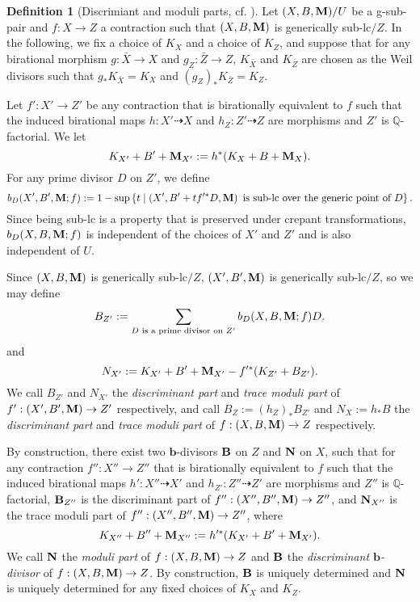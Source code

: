 \documentclass[11pt]{amsart}
\numberwithin{equation}{section}
\newcommand{\bb}{\bm{b}}
\newcommand{\Mm}{{\bf{M}}}
\newcommand{\Nn}{{\bf{N}}}
\newcommand{\Qq}{\mathbb{Q}}
\newcommand{\Bb}{{\bf{B}}}
\theoremstyle{definition}
\newtheorem{defn}[thm]{Definition}
\theoremstyle{definition}
\theoremstyle{definition}
\begin{document}
\begin{defn}[Discrimiant and moduli parts, cf. {\cite[Definition 2.3]{ACSS21}}]
Let $(X,B,\Mm)/U$ be a g-sub-pair and $f: X\rightarrow Z$ a contraction such that $(X,B,\Mm)$ is generically sub-lc$/Z$. In the following, we fix a choice of $K_X$ and a choice of $K_Z$, and suppose that for any birational morphism $g: \bar X\rightarrow X$ and $g_Z: \bar Z\rightarrow Z$, $K_{\bar X}$ and $K_{\bar Z}$ are chosen as the Weil divisors such that $g_*K_{\bar X}=K_X$ and $(g_Z)_*K_{\bar Z}=K_Z$.

Let $f': X'\rightarrow Z'$ be any contraction that is birationally equivalent to $f$ such that the induced birational maps $h: X'\dashrightarrow X$ and  $h_Z: Z'\dashrightarrow Z$ are morphisms and $Z'$ is $\Qq$-factorial. We let 
$$K_{X'}+B'+\Mm_{X'}:=h^*(K_X+B+\Mm_X).$$ 
For any prime divisor $D$ on $Z'$, we define
$$b_D(X',B',\Mm;f):=1-\sup\left\{t\mid \left(X',B'+tf'^*D,\Mm\right)\text{ is sub-lc over the generic point of } D\right\}.$$
Since being sub-lc is a property that is preserved under crepant transformations, $b_D(X,B,\Mm;f)$ is independent of the choices of $X'$ and $Z'$ and is also independent of $U$.

Since $(X,B,\Mm)$ is generically sub-lc$/Z$, $(X',B',\Mm)$ is generically sub-lc$/Z$, so we may define
$$B_{Z'}:=\sum_{D\text{ is a prime divisor on }Z'}b_D(X,B,\Mm;f)D.$$
and $$N_{X'}:=K_{X'}+B'+\Mm_{X'}-f'^*(K_{Z'}+B_{Z'}).$$
We call $B_{Z'}$ and $N_{X'}$ the \emph{discriminant part} and \emph{trace moduli part} of $f': (X',B',\Mm)\rightarrow Z'$ respectively, and call $B_Z:=(h_Z)_*B_{Z'}$ and $N_X:=h_*B$ the \emph{discriminant part} and \emph{trace moduli part} of $f: (X,B,\Mm)\rightarrow Z$ respectively.

By construction, there exist two $\bb$-divisors $\Bb$ on $Z$ and $\Nn$ on $X$, such that for any contraction $f'': X''\rightarrow Z''$ that is birationally equivalent to $f$ such that the induced birational maps $h': X''\dashrightarrow X'$ and  $h_{Z'}: Z''\dashrightarrow Z'$ are morphisms and $Z''$ is $\Qq$-factorial, $\Bb_{Z''}$ is the discriminant part of $f'': (X'',B'',\Mm)\rightarrow Z''$, and $\Nn_{X''}$ is the trace moduli part of  $f'': (X'',B'',\Mm)\rightarrow Z''$, where 
$$K_{X''}+B''+\Mm_{X''}:=h'^*(K_{X'}+B'+\Mm_{X'}).$$ 
We call $\Nn$ the \emph{moduli part} of $f: (X,B,\Mm)\rightarrow Z$ and $\Bb$ the \emph{discriminant $\bb$-divisor} of $f: (X,B,\Mm)\rightarrow Z$. By construction, $\Bb$ is uniquely determined and $\Nn$ is uniquely determined for any fixed choices of $K_X$ and $K_Z$.
\end{defn}
\end{document}
